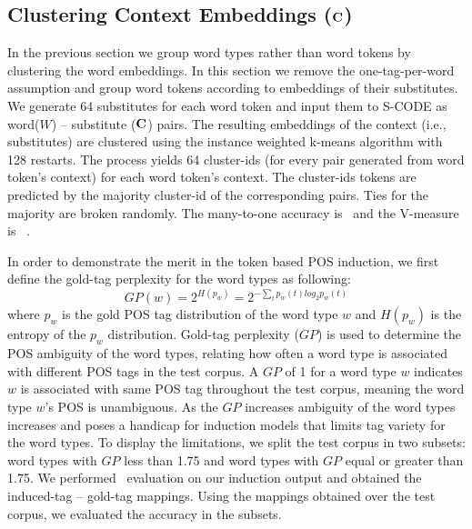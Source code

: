 \subsection{Clustering Context Embeddings (${\bf C}$)}
\label{sec:clustering-c}

In the previous section we group word types rather than word tokens by
clustering the word embeddings.  In this section we remove the
one-tag-per-word assumption and group word tokens according to
embeddings of their substitutes.  We generate 64 substitutes for each
word token and input them to S-CODE as word($W$) -- substitute (${\bf C}$)
pairs.  The resulting embeddings of the context (i.e., substitutes)
are clustered using the instance weighted k-means algorithm with 128
restarts.  The process yields 64 cluster-ids (for every pair generated
from word token's context) for each word token's context.  The
cluster-ids tokens are predicted by the majority cluster-id of the
corresponding pairs.  Ties for the majority are broken randomly.  The
many-to-one accuracy is \wsymto\ and the V-measure is \wsyvm\ .

In order to demonstrate the merit in the token based POS induction, we
first define the gold-tag perplexity for the word types as following:
\begin{equation} \label{eq:tag-perp}
GP(w) = 2^{H(p_w)} = 2^{-\sum_{t} p_w(t)log_2 p_w(t)}
\end{equation}
\noindent where $p_w$ is the gold POS tag distribution of the word
type $w$ and $H(p_w)$ is the entropy of the $p_w$ distribution.
Gold-tag perplexity ($GP$) is used to determine the POS ambiguity of
the word types, relating how often a word type is associated with
different POS tags in the test corpus.  A $GP$ of 1 for a word type
$w$ indicates $w$ is associated with same POS tag throughout the test
corpus, meaning the word type $w$'s POS is unambiguous.  As the $GP$
increases ambiguity of the word types increases and poses a handicap
for induction models that limits tag variety for the word types.  To
display the limitations, we split the test corpus in two subsets: word
types with $GP$ less than 1.75 and word types with $GP$ equal or
greater than 1.75.  We performed \mto\ evaluation on our induction
output and obtained the induced-tag -- gold-tag mappings. Using the
mappings obtained over the test corpus, we evaluated the accuracy in
the subsets. 

